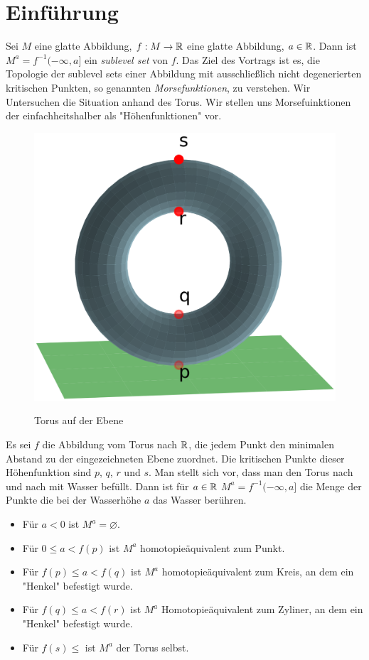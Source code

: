 \section{Einführung}

Sei $M$ eine glatte Abbildung, $f: M \to { \mathbb R }$ eine glatte Abbildung, 
$a \in { \mathbb R }$. Dann ist $M^a = f^{-1}(- \infty, a]$ ein \textit{sublevel set} von 
$f$. Das Ziel des Vortrags ist es, die Topologie der sublevel sets einer 
Abbildung mit ausschließlich nicht degenerierten kritischen Punkten, so genannten
\textit{Morsefunktionen}, zu verstehen.
Wir Untersuchen die Situation anhand des Torus. Wir stellen uns Morsefuinktionen
der einfachheitshalber als "Höhenfunktionen" vor.

\begin{figure}[H]
    \centering
    \includegraphics[width=0.6\linewidth]{resources/Me-Diagram1-torus-plane.png}
    \label{fig:me-diagram1}
    \caption{Torus auf der Ebene}
\end{figure}

Es sei $f$ die Abbildung vom Torus nach ${ \mathbb R }$, die jedem Punkt den minimalen
Abstand zu der eingezeichneten Ebene zuordnet. 
Die kritischen Punkte dieser Höhenfunktion sind $p$, $q$, $r$ und $s$.
Man stellt sich vor, dass man den Torus nach und nach mit Wasser befüllt. Dann 
ist für $a \in { \mathbb R }$ $M^a = f^{-1}(-\infty, a]$ die Menge der Punkte die bei der
Wasserhöhe $a$ das Wasser berühren. 

\begin{itemize}
    \item Für $a < 0$ ist $M^a = \varnothing$.
    \item Für $0 \leq a < f(p)$ ist $M^a$ homotopieäquivalent zum Punkt.
    \item Für $f(p) \leq a < f(q)$ ist $M^a$ homotopieäquivalent zum Kreis,
        an dem ein "Henkel" befestigt wurde.
    \item Für $f(q) \leq a < f(r)$ ist $M^a$ Homotopieäquivalent zum Zyliner,
        an dem ein "Henkel" befestigt wurde.
    \item Für $f(s) \leq$ ist $M^a$ der Torus selbst.
\end{itemize}

